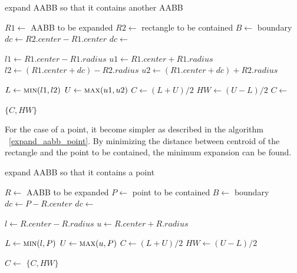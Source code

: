 \documentclass[10pt,letterpaper,twocolumn]{article}
\begin{document}
\begin{algorithm}
    \caption{expand AABB so that it contains another AABB}
    \label{expand_aabb_aabb}
    \begin{algorithmic}
        \State $R1 \gets$ AABB to be expanded
        \State $R2 \gets$ rectangle to be contained
        \State $B  \gets$ boundary
            \State $dc \gets R2.center - R1.center$
            \State $dc \gets$ 

            \State $l1 \gets R1.center - R1.radius$
            \State $u1 \gets R1.center + R1.radius$
            \State $l2 \gets (R1.center + dc) - R2.radius$
            \State $u2 \gets (R1.center + dc) + R2.radius$

            \State $L  \gets \Call{min}{l1, l2}$
            \State $U  \gets \Call{max}{u1, u2}$
            \State $C  \gets (L + U) / 2$
            \State $HW \gets (U - L) / 2$
            \State $C  \gets$ 

            \State \Return $\{C, HW\}$
        \EndFunction
     \end{algorithmic}
\end{algorithm}

For the case of a point, it become simpler as described in the algorithm
~\ref{expand_aabb_point}. By minimizing the distance between centroid of the
rectangle and the point to be contained, the minimum expansion can be found.

\begin{algorithm}
    \caption{expand AABB so that it contains a point}
    \label{expand_aabb_point}
    \begin{algorithmic}
        \State $R \gets$ AABB to be expanded
        \State $P \gets$ point to be contained
        \State $B \gets$ boundary
            \State $dc \gets P - R.center$
            \State $dc \gets$ 

            \State $l \gets R.center - R.radius$
            \State $u \gets R.center + R.radius$

            \State $L  \gets \Call{min}{l, P}$
            \State $U  \gets \Call{max}{u, P}$
            \State $C  \gets (L + U) / 2$
            \State $HW \gets (U - L) / 2$

            \State $C \gets$ 
            \State \Return $\{C, HW\}$
        \EndFunction
     \end{algorithmic}
\end{algorithm}
\end{document}
